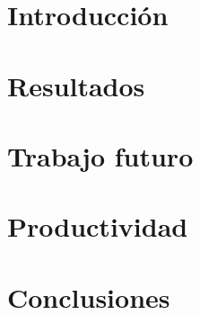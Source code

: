 
\section{Introducción}


\section{Resultados}


\section{Trabajo futuro}


\section{Productividad}


\section{Conclusiones}
